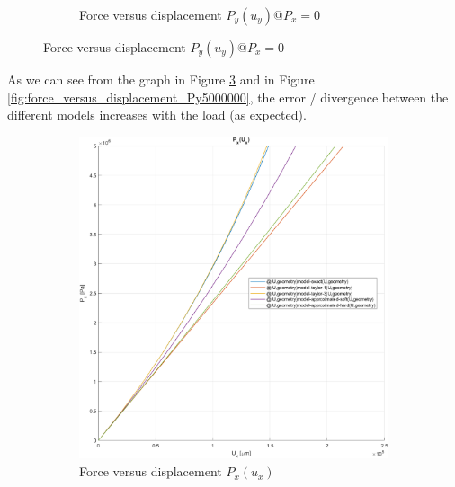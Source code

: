 \begin{figure}[H]
\begin{subfigure}[b]{0.45\textwidth}
        \caption{Force versus displacement $P_y(u_y) @ P_x = 0$}
        \label{fig:force_versus_displacement_Px0_Py5000000}
    \end{subfigure}
\end{figure}

As we can see from the graph in Figure \ref{fig:force_versus_displacement_Px5000000} and in Figure \ref{fig:force_versus_displacement_Py5000000}, the error / divergence between the different models increases with the load (as expected).

\begin{figure}[H]
    \centering
    \begin{subfigure}[b]{0.45\textwidth}
        \centering
        \includegraphics[width=.9\textwidth]{img/force_versus_displacement_Px5000000}
        \caption{Force versus displacement $P_x(u_x)$}
        \label{fig:force_versus_displacement_Px5000000}
    \end{subfigure}
    \hfill
    \begin{subfigure}[b]{0.45\textwidth}
        \centering

\end{subfigure}
\end{figure}
